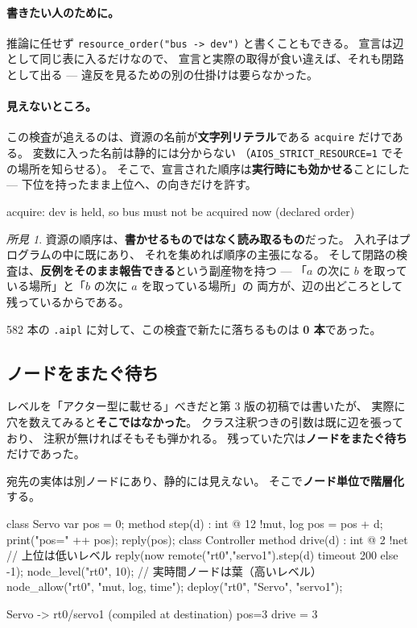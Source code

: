 \documentclass[11pt,a4paper]{ltjsarticle}
\theoremstyle{definition}
\theoremstyle{remark}
\newtheorem{finding}[theorem]{所見}
\begin{document}
\paragraph{書きたい人のために。}
推論に任せず \texttt{resource\_order("bus -> dev")} と書くこともできる。
宣言は辺として同じ表に入るだけなので、
宣言と実際の取得が食い違えば、それも閉路として出る ---
違反を見るための別の仕掛けは要らなかった。

\paragraph{見えないところ。}
この検査が追えるのは、資源の名前が\textbf{文字列リテラル}である
\texttt{acquire} だけである。
変数に入った名前は静的には分からない
（\texttt{AIOS\_STRICT\_RESOURCE=1} でその場所を知らせる）。
そこで、宣言された順序は\textbf{実行時にも効かせる}ことにした ---
下位を持ったまま上位へ、の向きだけを許す。

\begin{term}
acquire: dev is held, so bus must not be acquired now (declared order)
\end{term}

\begin{finding}
資源の順序は、\textbf{書かせるものではなく読み取るもの}だった。
入れ子はプログラムの中に既にあり、
それを集めれば順序の主張になる。
そして閉路の検査は、\textbf{反例をそのまま報告できる}という副産物を持つ ---
「$a$ の次に $b$ を取っている場所」と「$b$ の次に $a$ を取っている場所」の
両方が、辺の出どころとして残っているからである。

582 本の \texttt{.aipl} に対して、この検査で新たに落ちるものは
\textbf{0 本}であった。
\end{finding}

\subsection{ノードをまたぐ待ち}
\label{sec:nodelevel}

レベルを「アクター型に載せる」べきだと第 3 版の初稿では書いたが、
実際に穴を数えてみると\textbf{そこではなかった}。
クラス注釈つきの引数は既に辺を張っており、
注釈が無ければそもそも弾かれる。
残っていた穴は\textbf{ノードをまたぐ待ち}だけであった。

宛先の実体は別ノードにあり、静的には見えない。
そこで\textbf{ノード単位で階層化}する。

\begin{aipl}
class Servo {
  var pos = 0;
  method step(d) : int @ 12 !{mut, log} { pos = pos + d; print("pos=" ++ pos); reply(pos); }
}
class Controller {
  method drive(d) : int @ 2 !{net} {          // 上位は低いレベル
    reply(now remote("rt0","servo1").step(d) timeout 200 else -1);
  }
}
node_level("rt0", 10);              // 実時間ノードは葉（高いレベル）
node_allow("rt0", "mut, log, time");
deploy("rt0", "Servo", "servo1");
\end{aipl}
\begin{term}
[deploy] Servo -> rt0/servo1 (compiled at destination)
pos=3
drive = 3
\end{term}
\end{document}
